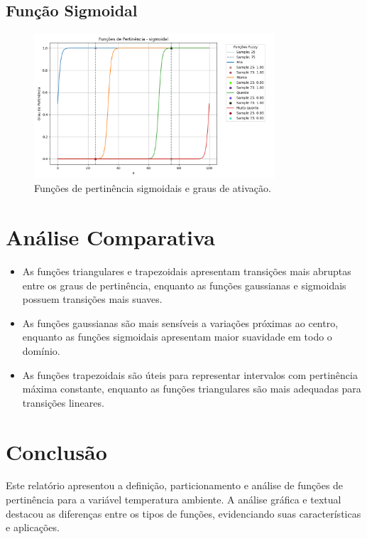 \documentclass[a4paper,12pt]{article}
\begin{document}
\subsection{Função Sigmoidal}
\begin{figure}[H]
    \centering
    \includegraphics[width=0.8\textwidth]{img/funções_de_pertinência_sigmoidal_fuzzificado.png}
    \caption{Funções de pertinência sigmoidais e graus de ativação.}
\end{figure}

\section{Análise Comparativa}
\begin{itemize}
    \item As funções triangulares e trapezoidais apresentam transições mais abruptas entre os graus de pertinência, enquanto as funções gaussianas e sigmoidais possuem transições mais suaves.
    \item As funções gaussianas são mais sensíveis a variações próximas ao centro, enquanto as funções sigmoidais apresentam maior suavidade em todo o domínio.
    \item As funções trapezoidais são úteis para representar intervalos com pertinência máxima constante, enquanto as funções triangulares são mais adequadas para transições lineares.
\end{itemize}

\section{Conclusão}
Este relatório apresentou a definição, particionamento e análise de funções de pertinência para a variável temperatura ambiente. A análise gráfica e textual destacou as diferenças entre os tipos de funções, evidenciando suas características e aplicações.
\end{document}
